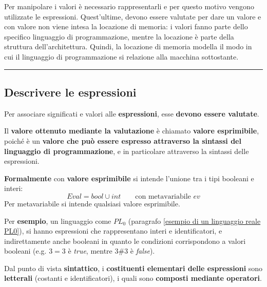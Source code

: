 \documentclass[a4paper]{article}
\newcommand{\longline}{\noindent\rule{\textwidth}{0.4pt}}
\begin{document}
	Per manipolare i valori è necessario rappresentarli e per questo motivo vengono utilizzate le espressioni. Quest'ultime, devono essere valutate per dare un valore e con valore non viene intesa la locazione di memoria: i valori fanno parte dello specifico linguaggio di programmazione, mentre la locazione è parte della struttura dell'architettura. Quindi, la locazione di memoria modella il modo in cui il linguaggio di programmazione si relazione alla macchina sottostante.
	
	\longline
	
	\subsection{Descrivere le espressioni}
	
	Per associare significati e valori alle \textbf{espressioni}, esse \textbf{devono essere valutate}.\newline
	
	\noindent
	Il \textbf{valore ottenuto mediante la valutazione} è chiamato \textbf{valore esprimibile}, poiché è un \textbf{valore che può essere espresso attraverso la sintassi del linguaggio di programmazione}, e in particolare attraverso la sintassi delle espressioni.\newline
	
	\noindent
	\textbf{Formalmente} con \textcolor{Red3}{\textbf{valore esprimibile}} si intende l'unione tra i tipi booleani e interi:
	\begin{equation*}
		Eval = bool \cup int \hspace{2em} \text{con metavariabile } ev
	\end{equation*}
	Per metavariabile si intende qualsiasi valore esprimibile.\newline
	
	\noindent
	Per \textcolor{Green4}{\textbf{esempio}}, un linguaggio come $PL_{0}$ (paragrafo \ref{esempio di un linguaggio reale PL0}), si hanno espressioni che rappresentano interi e identificatori, e indirettamente anche booleani in quanto le condizioni corrispondono a valori booleani (e.g. $3=3$ è \emph{true}, mentre $3\#3$ è \emph{false}).\newline
	
	\noindent
	Dal punto di vista \textbf{sintattico}, i \textbf{costituenti elementari delle espressioni} sono \textbf{letterali} (costanti e identificatori), i quali sono \textbf{composti mediante operatori}.\newline
	
\end{document}
